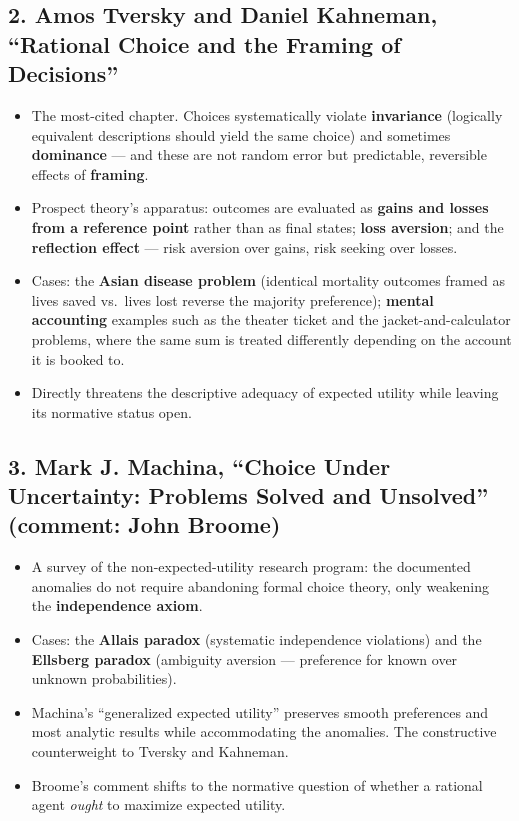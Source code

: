 \documentclass[12pt]{article}
\begin{document}
\subsection*{2. Amos Tversky and Daniel Kahneman, ``Rational Choice and the Framing of Decisions''}
\begin{itemize}[leftmargin=*, itemsep=3pt]
    \item The most-cited chapter. Choices systematically violate
    \textbf{invariance} (logically equivalent descriptions should yield the same
    choice) and sometimes \textbf{dominance} --- and these are not random
    error but predictable, reversible effects of \textbf{framing}.
    \item Prospect theory's apparatus: outcomes are evaluated as
    \textbf{gains and losses from a reference point} rather than as final
    states; \textbf{loss aversion}; and the \textbf{reflection effect} ---
    risk aversion over gains, risk seeking over losses.
    \item Cases: the \textbf{Asian disease problem} (identical mortality
    outcomes framed as lives saved vs.\ lives lost reverse the majority
    preference); \textbf{mental accounting} examples such as the theater
    ticket and the jacket-and-calculator problems, where the same sum is
    treated differently depending on the account it is booked to.
    \item Directly threatens the descriptive adequacy of expected utility while
    leaving its normative status open.
\end{itemize}

\subsection*{3. Mark J. Machina, ``Choice Under Uncertainty: Problems Solved and Unsolved'' (comment: John Broome)}
\begin{itemize}[leftmargin=*, itemsep=3pt]
    \item A survey of the non-expected-utility research program: the
    documented anomalies do not require abandoning formal choice theory, only
    weakening the \textbf{independence axiom}.
    \item Cases: the \textbf{Allais paradox} (systematic independence
    violations) and the \textbf{Ellsberg paradox} (ambiguity aversion ---
    preference for known over unknown probabilities).
    \item Machina's ``generalized expected utility'' preserves smooth
    preferences and most analytic results while accommodating the anomalies.
    The constructive counterweight to Tversky and Kahneman.
    \item Broome's comment shifts to the normative question of whether a
    rational agent \emph{ought} to maximize expected utility.
\end{itemize}
\end{document}
